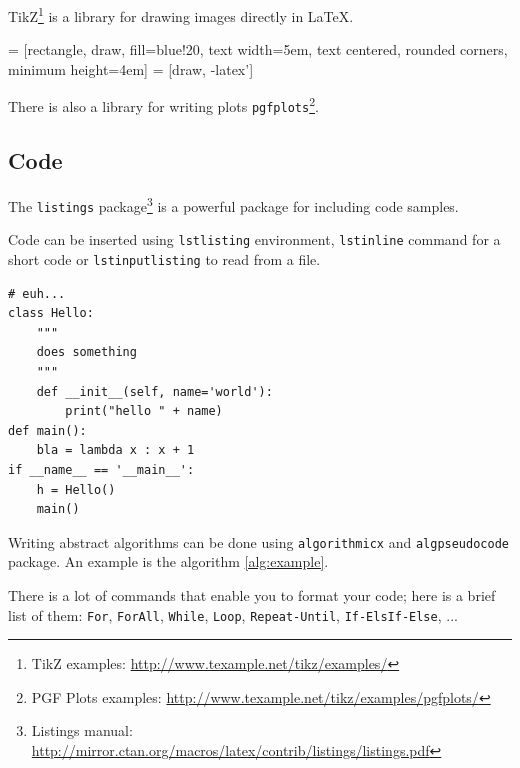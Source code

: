 TikZ\footnote{%
TikZ examples: \url{http://www.texample.net/tikz/examples/}}
is a library for drawing images directly in \LaTeX{}.
\begin{center}
 = [rectangle, draw, fill=blue!20,
	text width=5em, text centered, rounded corners, minimum height=4em]
 = [draw, -latex']
\end{center}

There is also a library for writing plots \texttt{pgfplots}\footnote{%
PGF Plots examples: \url{http://www.texample.net/tikz/examples/pgfplots/}}.
\begin{center}
\end{center}

\subsection{Code}

The \texttt{listings} package\footnote{%
Listings manual:
\url{http://mirror.ctan.org/macros/latex/contrib/listings/listings.pdf}}
is a powerful package for including code samples.

Code can be inserted using \texttt{lstlisting} environment, \texttt{lstinline}
command for a short code or \texttt{lstinputlisting} to read from a file.

\begin{lstlisting}[style=python]
# euh...
class Hello:
	"""
	does something
	"""
	def __init__(self, name='world'):
		print("hello " + name)
def main():
	bla = lambda x : x + 1
if __name__ == '__main__':
	h = Hello()
	main()
\end{lstlisting}

Writing abstract algorithms can be done using \texttt{algorithmicx} and
\texttt{algpseudocode} package.
An example is the algorithm \ref{alg:example}.

There is a lot of commands that enable you to format your code;
here is a brief list of them:
\texttt{For}, \texttt{ForAll}, \texttt{While}, \texttt{Loop},
\texttt{Repeat-Until}, \texttt{If-ElsIf-Else}, ...

